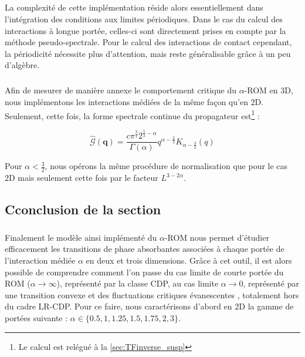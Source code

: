 \subparagraph{}La complexité de cette implémentation réside alors essentiellement dans l'intégration des conditions aux limites périodiques. Dans le cas du calcul des interactions à longue portée, celles-ci sont directement prises en compte par la méthode pseudo-spectrale. Pour le calcul des interactions de contact cependant, la périodicité nécessite plus d'attention, mais reste généralisable grâce à un peu d'algèbre. 


\subparagraph{}Afin de mesurer de manière annexe le comportement critique du $\alpha$-ROM en 3D, nous implémentons les interactions médiées de la même façon qu'en 2D. Seulement, cette fois, la forme spectrale continue du propagateur est\footnote{Le calcul est relégué à la \autoref{sec:TFinverse_susp}} :


\begin{equation}
	\hat{\mathcal{G}}(\mathbf{q}) = \frac{c\pi^\frac{3}{2}2^{\frac{5}{2}-\alpha}}{\Gamma (\alpha)}q^{\alpha-\frac{3}{2}}K_{\alpha-\frac{3}{2}}(q)
\end{equation}

\noindent Pour $\alpha < \frac{3}{2}$, nous opérons la même procédure de normalisation que pour le cas 2D mais seulement cette fois par le facteur $L^{3-2\alpha}$.

\subsection*{Cconclusion de la section}

\subparagraph{}Finalement le modèle ainsi implémenté du $\alpha$-ROM nous permet d'étudier efficacement les transitions de phase absorbantes associées à chaque portée de l'interaction médiée $\alpha$ en deux et trois dimensions. Grâce à cet outil, il est alors possible de comprendre comment l'on passe du cas limite de courte portée du ROM ($\alpha\rightarrow\infty$), représenté par la classe CDP, au cas limite $\alpha \rightarrow 0$, représenté par une transition convexe et des fluctuations critiques évanescentes \cite{mari_absorbing_2022}, totalement hors du cadre LR-CDP. Pour ce faire, nous caractérisons d'abord en 2D la gamme de portées suivante : $\alpha \in \{ 0.5, 1, 1.25, 1.5, 1.75, 2, 3 \}$.

